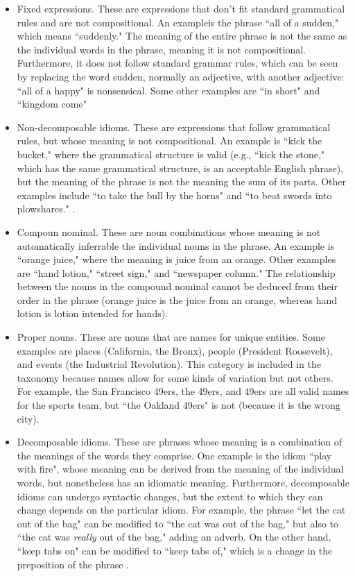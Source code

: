 \documentclass[11pt]{article}
\begin{document}
\begin{itemize}
\item Fixed expressions. These are expressions that don't fit standard grammatical rules and are not compositional. An exampleis the phrase ``all of a sudden," which means ``suddenly." The meaning of the entire phrase is not the same as the individual words in the phrase, meaning it is not compositional. Furthermore, it does not follow standard grammar rules, which can be seen by replacing the word sudden, normally an adjective, with another adjective: ``all of a happy" is nonsensical. Some other examples are ``in short" and ``kingdom come"

\item Non-decomposable idioms. These are expressions that follow grammatical rules, but whose meaning is not compositional. An example is ``kick the bucket," where the grammatical structure is valid (e.g., ``kick the stone," which has the same grammatical structure, is an acceptable English phrase), but the meaning of the phrase is not the meaning the sum of its parts. Other examples include ``to take the bull by the horns" and ``to beat swords into plowshares." \cite{nunberg1994idioms}.

\item Compoun nominal. These are noun combinations whose meaning is not automatically inferrable the individual nouns in the phrase. An example is ``orange juice," where the meaning is juice from an orange. Other examples are ``hand lotion," ``street sign," and ``newspaper column." The relationship between the nouns in the compound nominal cannot be deduced from their order in the phrase (orange juice is the juice from an orange, whereas hand lotion is lotion intended for hands).

\item Proper nouns. These are nouns that are names for unique entities. Some examples are places (California, the Bronx), people (President Roosevelt), and events (the Industrial Revolution). This category is included in the taxonomy because names allow for some kinds of variation but not others. For example, the San Francisco 49ers, the 49ers, and 49ers are all valid names for the sports team, but ``the Oakland 49ers" is not (because it is the wrong city).

\item Decomposable idioms. These are phrases whose meaning is a combination of the meanings of the words they comprise. One example is the idiom ``play with fire", whose meaning can be derived from the meaning of the individual words, but nonetheless has an idiomatic meaning. Furthermore, decomposable idioms can undergo syntactic changes, but the extent to which they can change depends on the particular idiom. For example, the phrase ``let the cat out of the bag" can be modified to ``the cat was out of the bag," but also to ``the cat was \textit{really} out of the bag," adding an adverb. On the other hand, ``keep tabs on" can be modified to ``keep tabs of,"  which is a change in the preposition of the phrase \cite{Riehemann01aconstructional}. 


\end{itemize}
\end{document}
